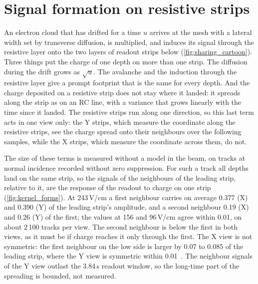 \section{Signal formation on resistive strips}\label{sec:kernel}
An electron cloud that has drifted for a time $u$ arrives at the mesh with a lateral width set by transverse
diffusion, is multiplied, and induces its signal through the resistive layer onto the two layers of readout strips
below (\cref{fig:sharing_cartoon}). Three things put the charge of one depth on more than one strip. The diffusion
during the drift grows as $\sqrt{u}$. The avalanche and the induction through the resistive layer give a prompt
footprint that is the same for every depth. And the charge deposited on a resistive strip does not stay where it
landed: it spreads along the strip as on an RC line, with a variance that grows linearly with the time since it
landed. The resistive strips run along one direction, so this last term acts in one view only: the Y strips, which
measure the coordinate along the resistive strips, see the charge spread onto their neighbours over the following
samples, while the X strips, which measure the coordinate across them, do not.

The size of these terms is measured without a model in the beam, on tracks at normal incidence recorded without zero
suppression. For such a track all depths land on the same strip, so the signals of the neighbours of the leading
strip, relative to it, are the response of the readout to charge on one strip (\cref{fig:kernel_forms}). At
243\,V/cm a first neighbour carries on average 0.377 (X) and 0.390 (Y) of the leading strip's amplitude, and
a second neighbour 0.19 (X) and 0.26 (Y) of the first; the values at 156 and 96\,V/cm agree within 0.01, on about
2\,100 tracks per view. The second neighbour is below the first in both views, as it must be if charge reaches it
only through the first. The X view is not symmetric: the first neighbour on the low side is larger by 0.07 to
0.085 of the leading strip, where the Y view is symmetric within 0.01~\cite{paperI}. The neighbour signals of the Y
view outlast the 3.84\,\textmu s readout window, so the long-time part of the spreading is bounded, not measured.

